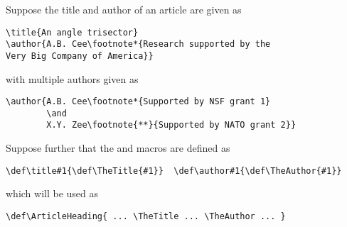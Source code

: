 \documentclass[letterpaper]{book}
\begin{document}
Suppose the title and author of an article are given as
\begin{verbatim}
\title{An angle trisector}
\author{A.B. Cee\footnote*{Research supported by the
Very Big Company of America}}
\end{verbatim}
with multiple authors
given as
\begin{verbatim}
\author{A.B. Cee\footnote*{Supported by NSF grant 1}
        \and
        X.Y. Zee\footnote{**}{Supported by NATO grant 2}}
\end{verbatim}
Suppose further that the  and  macros
are defined as
\begin{verbatim}
\def\title#1{\def\TheTitle{#1}}  \def\author#1{\def\TheAuthor{#1}}
\end{verbatim}
which will be used as
\begin{verbatim}
\def\ArticleHeading{ ... \TheTitle ... \TheAuthor ... }
\end{verbatim}
\end{document}
